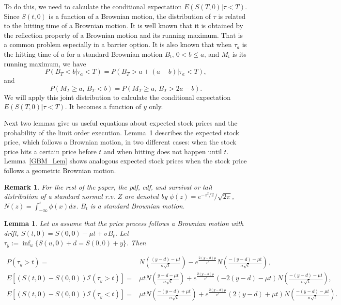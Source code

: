 \documentclass[11pt]{article}
\theoremstyle{plain}
\numberwithin{equation}{section}
\newtheorem{lem}[thm]{Lemma}
\newtheorem{remk}{Remark}
\newcommand{\Red}{\color{Red}}
\begin{document}
{ To do this, we need to calculate the conditional expectation $E(S(T,0)|\tau<T)$. Since $S(t,0)$ is a function of a Brownian motion, the distribution of $\tau$ is related to the hitting time of a Brownian motion. It is well known that it is obtained by the reflection property of a Brownian motion and its running maximum. That is a common problem especially in a barrier option. It is also known that when $\tau_a$ is the hitting time of $a$ for a standard Brownian motion $B_t$, $0< b \leq a$, and $M_t$ is its running maximum, we have
\[
P(B_T<b|\tau_a <T)= P(B_T > a +(a-b)|\tau_a <T),
\]
and
\[
P(M_T \geq a, \, B_T <b)=P(M_T \geq a, \, B_T>2a-b).
\]
We will apply this joint distribution to calculate the conditional expectation $E(S(T,0)|\tau<T)$. It becomes a function of $y$ only. 

{
Next two lemmas give us useful equations about expected stock prices and the probability of the limit order execution. Lemma~\ref{BM_Lem} describes the expected stock price, which follows a Brownian motion, in two different cases: when the stock price hits a certain price before $t$ and when hitting does not happen until $t$. Lemma~\ref{GBM_Lem} shows analogous expected stock prices when the stock price follows a geometric Brownian motion.
}
{\Red
\begin{remk}
For the rest of the paper, the pdf, cdf, and survival or tail distribution of a standard normal r.v. $Z$ are denoted by $\phi(z)=e^{-z^{2}/2}/\sqrt{2\pi}$, $N(z)=\int_{-\infty}^{z}\phi(x)dx$. $B_t$ is a standard Brownian motion. 
\end{remk}

}

{
\begin{lem}\label{BM_Lem}
	Let us assume that the price process follows a Brownian motion with drift, $S(t,0)=S(0,0)+\mu t +\sigma B_t$. Let $\tau_y:=\inf_{u} \{S(u,0)+d=S(0,0)+y \}.$ Then
	
	\begin{align}\nonumber
		P(\tau_y>t)=&N\left(\frac{(y-d)-\mu t}{\sigma\sqrt{t}}\right)-e^{\frac{2(y-d)\mu }{\sigma^2} } N\left(\frac{-(y-d)-\mu t}{\sigma\sqrt{t}}\right),\\ \nonumber
		E[(S(t,0)-S(0,0)) \mathcal{I}(\tau_y>t)]=&\mu t N\left(\frac{y-d-\mu t}{\sigma\sqrt{t}}\right) +e^{\frac{2(y-d)\mu }{\sigma^2} }(-2(y-d)-\mu t)  N\left(\frac{-(y-d)-\mu t}{\sigma\sqrt{t}}\right),\\ \nonumber
		E[(S(t,0)-S(0,0))\mathcal{I}(\tau_y<t)]=&\mu t N\left(\frac{-(y-d)+\mu t}{\sigma\sqrt{t}}\right) +e^{\frac{2(y-d)\mu }{\sigma^2} }(2(y-d)+\mu t)  N\left(\frac{-(y-d)-\mu t}{\sigma\sqrt{t}}\right).
	\end{align}


\end{lem}}}
\end{document}
